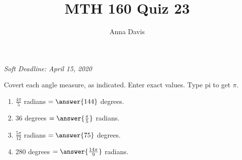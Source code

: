 \documentclass{ximera}
\author{Anna Davis} \title{MTH 160 Quiz 23}
\begin{document}
\begin{abstract}

\end{abstract}
\maketitle
 \textit{Soft Deadline: April 15, 2020}
\begin{problem}\label{prob:quiz22prob1}
Covert each angle measure, as indicated.  Enter exact values.  Type pi to get $\pi$.
\begin{enumerate}
    \item $\frac{4\pi}{5}$ radians $=\answer{144}$ degrees.
    \item $36$ degrees $=\answer{\frac{\pi}{5}}$ radians.
    \item $\frac{5\pi}{12}$ radians $=\answer{75}$ degrees.
    \item $280$ degrees $=\answer{\frac{14\pi}{9}}$ radians.
\end{enumerate}
\end{problem}
\end{document}
